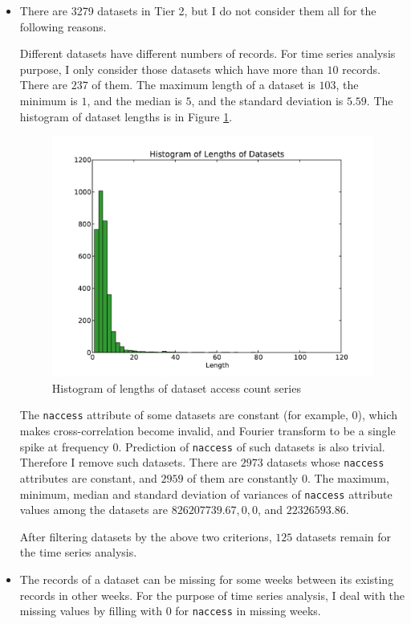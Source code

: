 \documentclass[preprint, 12pt]{elsarticle}
\begin{document}
\begin{itemize}

  \item
There are 3279 datasets in Tier 2, but I do not consider them all for the following reasons.

Different datasets have different numbers of records.
For time series analysis purpose, I only consider those datasets which have more than $10$ records. There are $237$ of them.
The maximum length of a dataset is $103$, the minimum is $1$, and the median is  $5$, and the standard deviation is $5.59$.
The histogram of dataset lengths is in Figure \ref{len}.
 
\begin{figure}
\begin{center}
\includegraphics[scale=0.5]{../data/timeseries/datasets/dataset_3279_lengths_hist.pdf}
\end{center}
\caption{Histogram of lengths of dataset access count series}
\label{len}
\end{figure}
   
 
The \verb|naccess| attribute of some datasets are constant (for example, $0$), which makes cross-correlation become invalid, and Fourier transform to be a single spike at frequency $0$. Prediction of \verb|naccess| of such datasets is also trivial. Therefore I remove such datasets.
There are $2973$ datasets whose \verb|naccess| attributes are constant, and $2959$ of them are constantly $0$.
The maximum, minimum, median and standard deviation of variances of \verb|naccess| attribute values among the datasets are $826207739.67, 0, 0$, and $22326593.86$.

After filtering datasets by the above two criterions, $125$ datasets remain for the time series analysis.

\item
The records of a dataset can be missing for some weeks between its existing records in other weeks. For the purpose of time series analysis, I deal with the missing values by filling with $0$ for \verb|naccess| in missing weeks.

\end{itemize}
\end{document}
